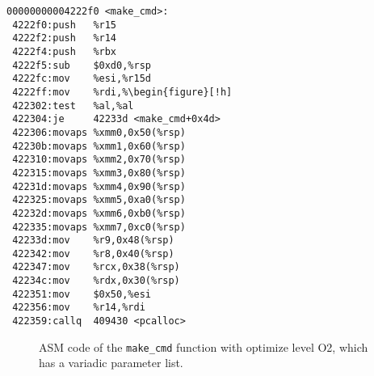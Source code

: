 
\newsavebox{\firstlistingA}
\begin{lrbox}{\firstlistingA}
\begin{minipage}[c]{0.45\linewidth}
\begin{verbatim}
00000000004222f0 <make_cmd>:
 4222f0:push   %r15
 4222f2:push   %r14
 4222f4:push   %rbx
 4222f5:sub    $0xd0,%rsp
 4222fc:mov    %esi,%r15d
 4222ff:mov    %rdi,%\begin{figure}[!h]
 422302:test   %al,%al
 422304:je     42233d <make_cmd+0x4d>
 422306:movaps %xmm0,0x50(%rsp)
 42230b:movaps %xmm1,0x60(%rsp)
 422310:movaps %xmm2,0x70(%rsp)
 422315:movaps %xmm3,0x80(%rsp)
 42231d:movaps %xmm4,0x90(%rsp)
 422325:movaps %xmm5,0xa0(%rsp)
 42232d:movaps %xmm6,0xb0(%rsp)
 422335:movaps %xmm7,0xc0(%rsp)
 42233d:mov    %r9,0x48(%rsp)
 422342:mov    %r8,0x40(%rsp)
 422347:mov    %rcx,0x38(%rsp)
 42234c:mov    %rdx,0x30(%rsp)
 422351:mov    $0x50,%esi
 422356:mov    %r14,%rdi
 422359:callq  409430 <pcalloc>
\end{verbatim}
\end{minipage}
\end{lrbox}
\begin{figure}[H]
\centering
{\usebox{\firstlistingA}} 
\caption{ASM code of the \texttt{make\_cmd} function with optimize level O2, which has a variadic parameter list.}
\label{fig:asmvariadic}
\end{figure}

